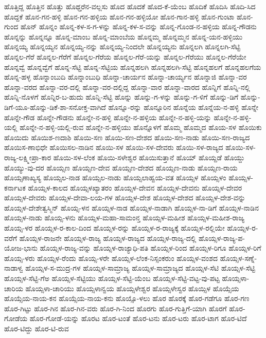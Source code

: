 ಹೊತ್ತಿದ್ದ
ಹೊತ್ತಿನ
ಹೊತ್ತು
ಹೊಥ್ತರೆನ-ವಲ್ಲಸು
ಹೊದ
ಹೊದಕೆ
ಹೊದ-ಕೆ-ಯೆಂಬ
ಹೊದಿಕೆ
ಹೊದಿಸಿ
ಹೊದಿ-ಸಿದ
ಹೊದ್ದಕೆ
ಹೊನ-ಗನ-ಹಳ್ಳಿ
ಹೊನ-ಗನ-ಹಳ್ಳಿಯ
ಹೊನ-ಗನ-ಹಳ್ಳಿಯೋ
ಹೊನ-ಗಾನ-ಹಳ್ಳಿ
ಹೊನ-ಗುಂಟಾ
ಹೊನ-ಗುಂದ
ಹೊನ್
ಹೊನ್ನಂ
ಹೊನ್ನ-ಕಳ-ಸ-ಗ-ಳನ್ನು
ಹೊನ್ನ-ಕಳ-ಸ-ವನ್ನು
ಹೊನ್ನ-ಗೊಂಡ-ನ-ಹಳ್ಳಿಯ
ಹೊನ್ನ-ಗೌಡನು
ಹೊನ್ನನ್ನು
ಹೊನ್ನನ್ನೂ
ಹೊನ್ನ-ಮಾಂಬ
ಹೊನ್ನ-ಮಾಂಬೆಯ
ಹೊನ್ನಮ್ಮ
ಹೊನ್ನಮ್ಮನ
ಹೊನ್ನ-ಯನ-ಹಳ್ಳಿಯು
ಹೊನ್ನಯ್ಯ
ಹೊನ್ನಯ್ಯನ
ಹೊನ್ನಯ್ಯ-ನನ್ನು
ಹೊನ್ನಯ್ಯ-ನಿಂದಲೇ
ಹೊನ್ನಯ್ಯನು
ಹೊನ್ನಲಗಿ
ಹೊನ್ನಲಗಿ-ಸೆಟ್ಟಿ
ಹೊನ್ನಲ-ಗೆರೆ
ಹೊನ್ನಲ-ಗೆರೆಗೆ
ಹೊನ್ನಲ-ಗೆರೆಯ
ಹೊನ್ನಲ-ಗೆರೆ-ಯನ್ನು
ಹೊನ್ನಲ-ಗೆರೆಯು
ಹೊನ್ನಲ-ಗೆರೆಯೇ
ಹೊನ್ನವ್ವೆ
ಹೊನ್ನವ್ವೆಗೆ
ಹೊನ್ನ-ಸೆಟ್ಟಿ
ಹೊನ್ನ-ಸೆಟ್ಟಿಯ
ಹೊನ್ನಹಲಗಿ
ಹೊನ್ನಹಲಗಿ-ಸೆಟ್ಟಿ
ಹೊನ್ನಹಲಗೆ
ಹೊನ್ನಹಲಗೆಯ
ಹೊನ್ನ-ಹಳ್ಳ
ಹೊನ್ನಾಂಬುದಿ
ಹೊನ್ನಾಂಬುಧಿ
ಹೊನ್ನಾ-ಚಾರ್ಯನ
ಹೊನ್ನಾ-ಚಾರ್ಯ್ಯನ
ಹೊನ್ನಾಜಿ
ಹೊನ್ನಾ-ವರ
ಹೊನ್ನಾ-ವರದ
ಹೊನ್ನಾ-ವರ-ದಲ್ಲಿ
ಹೊನ್ನಾ-ವರ-ದಲ್ಲಿದ್ದ
ಹೊನ್ನಾ-ವಾರ
ಹೊನ್ನಾ-ವಾರದ
ಹೊನ್ನಿಗೆ
ಹೊನ್ನಿ-ನಲ್ಲಿ
ಹೊನ್ನಿ-ನೊಳಗೆ
ಹೊನ್ನಿರ-ಬ-ಹುದು
ಹೊನ್ನಿ-ಸೆಟ್ಟಿ
ಹೊನ್ನು
ಹೊನ್ನು-ಗ-ಳನ್ನು
ಹೊನ್ನು-ಗ-ಳಿಗೆ
ಹೊನ್ನು-ಡಿಗೆ
ಹೊನ್ನು-ಡಿಗೆ-ಯೂ-ಹೊನ್ನು-ಡಿಕೆ-ಶಾ-ಸನೋಕ್ತ-ವಾಗಿದೆ
ಹೊನ್ನೂ-ರನ್ನು
ಹೊನ್ನೂರಿನ
ಹೊನ್ನೆಯ
ಹೊನ್ನೆಯ-ನ-ಹಳ್ಳಿ
ಹೊನ್ನೇ
ಹೊನ್ನೇ-ಗೌಡ
ಹೊನ್ನೇ-ಗೌಡನು
ಹೊನ್ನೇ-ನ-ಹಳ್ಳಿ
ಹೊನ್ನೇ-ನ-ಹಳ್ಳಿಯ
ಹೊನ್ನೇ-ನ-ಹಳ್ಳಿ-ಯನ್ನು
ಹೊನ್ನೇ-ನ-ಹಳ್ಳಿ-ಯಲ್ಲಿ
ಹೊನ್ನೇ-ನ-ಹಳ್ಳಿ-ಯಲ್ಲಿ-ರುವ
ಹೊನ್ನೇ-ನ-ಹಳ್ಳಿಯು
ಹೊನ್ನೊಳಗೆ
ಹೊಮ್ಮ
ಹೊಮ್ಮದ
ಹೊಯ-ಸಳ
ಹೊಯಿಕು
ಹೊಯಿದು
ಹೊಯಿಶ-ಣದಾಶಿ
ಹೊಯಿ-ಸಣ
ಹೊಯಿ-ಸಣ-ದೇಶದ
ಹೊಯಿ-ಸಣ-ನಾಡು
ಹೊಯಿ-ಸಣ-ರಾಜ್ಯದ
ಹೊಯಿಸ-ಣಾಭಿಧೇ
ಹೊಯಿಸಲ-ನಾಡಿನ
ಹೊಯಿ-ಸಳ
ಹೊಯಿ-ಸಳ-ದೇವರು
ಹೊಯಿ-ಸಳ-ರಾಜ್ಯದ
ಹೊಯಿ-ಸಳ-ರಾಜ್ಯ-ಲಕ್ಷ್ಮೀಪ್ರಾ-ಕಾರ
ಹೊಯಿ-ಸಳ-ಲೆಂಕ
ಹೊಯಿ-ಸಳೇಶ್ವರ
ಹೊಯಿಸುತ್ತಾನೆ
ಹೊಯ್
ಹೊಯ್ದಡೆ
ಹೊಯ್ದು
ಹೊಯ್ಯು-ವು-ದರ
ಹೊಯ್ಸಣ
ಹೊಯ್ಸಣ-ದೇವ
ಹೊಯ್ಸಣ-ದೇಶದ
ಹೊಯ್ಸಣ-ನಾಡು
ಹೊಯ್ಸಣ-ರಾಯ
ಹೊಯ್ಸಣಾಖ್ಯಸ್ಯ
ಹೊಯ್ಸಲ-ನಾಡ
ಹೊಯ್ಸಲ-ನಾಡು
ಹೊಯ್ಸಲಾಹ್ವಯ-ವತ
ಹೊಯ್ಸಳ
ಹೊಯ್ಸಳಂ
ಹೊಯ್ಸಳ-ಕರ್ನಾಟಕ
ಹೊಯ್ಸಳ-ಕಾಲದ
ಹೊಯ್ಸಳಖ್ಯಾತರಂ
ಹೊಯ್ಸಳ-ದೇವನ
ಹೊಯ್ಸಳ-ದೇವನು
ಹೊಯ್ಸಳ-ದೇವರ
ಹೊಯ್ಸಳ-ದೇವರು
ಹೊಯ್ಸಳ-ದೇವಾ-ಲಯ-ಗಳ
ಹೊಯ್ಸಳ-ದೇಶ
ಹೊಯ್ಸಳ-ದೇಶದ
ಹೊಯ್ಸಳ-ದೇಶ-ವನ್ನು
ಹೊಯ್ಸಳ-ದೇಶೇತ್ವಸ್ಮಿನ್
ಹೊಯ್ಸ-ಳನ
ಹೊಯ್ಸಳ-ನಾಡ
ಹೊಯ್ಸಳ-ನಾಡಾಗಿ
ಹೊಯ್ಸಳ-ನಾ-ಡಿಗೆ
ಹೊಯ್ಸಳ-ನಾಡಿನ
ಹೊಯ್ಸಳ-ನಾಡು
ಹೊಯ್ಸ-ಳನು
ಹೊಯ್ಸಳ-ಮಹಾ-ಸಾಮಂನ್ತ
ಹೊಯ್ಸಳ-ಮಹೀಶ
ಹೊಯ್ಸಳ-ಮಹೀಶ-ರಾಜ್ಯ
ಹೊಯ್ಸ-ಳರ
ಹೊಯ್ಸಳ-ರ-ಕಾಲ-ದಿಂದ
ಹೊಯ್ಸಳ-ರನ್ನು
ಹೊಯ್ಸಳ-ರ-ರಾಜ್ಯಕ್ಕೆ
ಹೊಯ್ಸಳ-ರಲ್ಲಿಯೇ
ಹೊಯ್ಸಳ-ರ-ವರೆಗೆ
ಹೊಯ್ಸಳ-ರಾಜನೇ
ಹೊಯ್ಸಳ-ರಾಜ್ಯ
ಹೊಯ್ಸಳ-ರಾಜ್ಯದ
ಹೊಯ್ಸಳ-ರಾಜ್ಯ-ದಲ್ಲಿ
ಹೊಯ್ಸಳ-ರಾಜ್ಯ-ಪ-ಯೋಜ-ಭಾನು
ಹೊಯ್ಸಳ-ರಾಜ್ಯ-ವನ್ನು
ಹೊಯ್ಸಳ-ರಾಜ್ಯಾಧಿ-ಪತಿ
ಹೊಯ್ಸಳ-ರಿಂದ
ಹೊಯ್ಸಳ-ರಿಗೂ
ಹೊಯ್ಸಳ-ರಿಗೆ
ಹೊಯ್ಸ-ಳರು
ಹೊಯ್ಸಳ-ರೆಂದು
ಹೊಯ್ಸ-ಳರೇ
ಹೊಯ್ಸಳ-ಲೆಂಕ-ನಿಸ್ಸಂಕರುಂ
ಹೊಯ್ಸಳ-ವಂಶದ
ಹೊಯ್ಸಳ-ಸಣ್ನೆ-ನಾಡಾಳ್ವ
ಹೊಯ್ಸಳ-ಸ-ಮುದ್ರ-ಗಳ
ಹೊಯ್ಸಳ-ಸಾಮ್ರಾಜ್ಯ
ಹೊಯ್ಸಳ-ಸಾಮ್ರಾಜ್ಯದ
ಹೊಯ್ಸಳ-ಸೆಟಿ
ಹೊಯ್ಸಳ-ಸೆಟ್ಟಿ
ಹೊಯ್ಸಳ-ಸೆಟ್ಟಿ-ಗೆಅ
ಹೊಯ್ಸಳ-ಸೆಟ್ಟಿಯು
ಹೊಯ್ಸಳ-ಸೆಟ್ಟಿ-ಯೆಂಬ
ಹೊಯ್ಸಳ-ಸೆಟ್ಟಿ-ವಟ್ಟ-ವು-ಪಟ್ಟ
ಹೊಯ್ಸಳಾ-ಚಾರಿಯ
ಹೊಯ್ಸಳಾ-ಚಾರಿಯು
ಹೊಯ್ಸಳಾನ್ವಯ
ಹೊಯ್ಸಳೇಶ್ವರ
ಹೊಯ್ಸಳೇಸ್ವರ
ಹೊಯ್ಸಿಳ
ಹೊಯ್ಸೆಯ
ಹೊಯ್ಸೆಯ-ನಾಯ-ಕನ
ಹೊಯ್ಸೆಯ-ನಾಯ-ಕನು
ಹೊಯ್ಸೊ-ಳಲು
ಹೊರ
ಹೊರಕ್ಕೆ
ಹೊರ-ಗಡೆಗೂ
ಹೊರ-ಗಣ
ಹೊರ-ಗಿಟ್ಟು
ಹೊರ-ಗಿನ
ಹೊರ-ಗಿನ-ವರು
ಹೊರ-ಗಿ-ನಿಂದ
ಹೊರಗು
ಹೊರ-ಗುತ್ತಿಗೆ-ಯಾಗಿ
ಹೊರಗೆ
ಹೊರ-ಗೋಡೆಯ
ಹೊರ-ಗೋಡೆ-ಯನ್ನು
ಹೊರಟ
ಹೊರ-ಟಂತೆ
ಹೊರ-ಟನು
ಹೊರ-ಟರು
ಹೊರ-ಟಾಗ
ಹೊರ-ಟಿದೆ
ಹೊರ-ಟಿದ್ದು
ಹೊರ-ಟಿ-ರುವ
